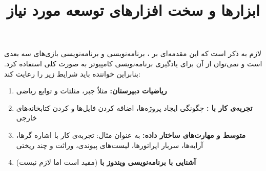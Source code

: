 {
    \Large
    \begin{spacing}{1.5}
        لازم به ذکر است که این مقدمه‌ای بر ، برنامه‌نویسی  و برنامه‌نویسی بازی‌های سه بعدی است و نمی‌توان از آن برای یادگیری برنامه‌نویسی کامپیوتر به صورت کلی استفاده کرد. بنابراین خواننده باید شرایط زیر را رعایت کند:
        \begin{enumerate}[label=\textbf{\arabic*}.]
            \item {\textbf{ریاضیات دبیرستان: } مثلاً جبر، مثلثات و توابع ریاضی}
            \item {\textbf{تجربه‌ی کار با :} چگونگی ایجاد پروژه‌ها، اضافه کردن فایل‌ها و  کردن کتابخانه‌های خارجی}
            \item {\textbf{ متوسط و مهارت‌های ساختار داده:} به عنوان مثال: تجربه‌ی کار با اشاره گر‌ها، آرایه‌ها، سربار اپراتور‌ها، لیست‌های پیوندی، وراثت و چند ریختی}
            \item {\textbf{آشنایی با برنامه‌نویسی ویندوز با } (مفید است اما لازم نیست)}
        \end{enumerate}
    \end{spacing}
}
\textbf{\vspace{10pt}}

\title{
    \huge
    \hspace{-40pt}
    \textbf{ابزارها و سخت افزارهای توسعه مورد نیاز}
}  \rullFillWithLine[0.5em]{1pt}
\textbf{\vspace{7pt}}

